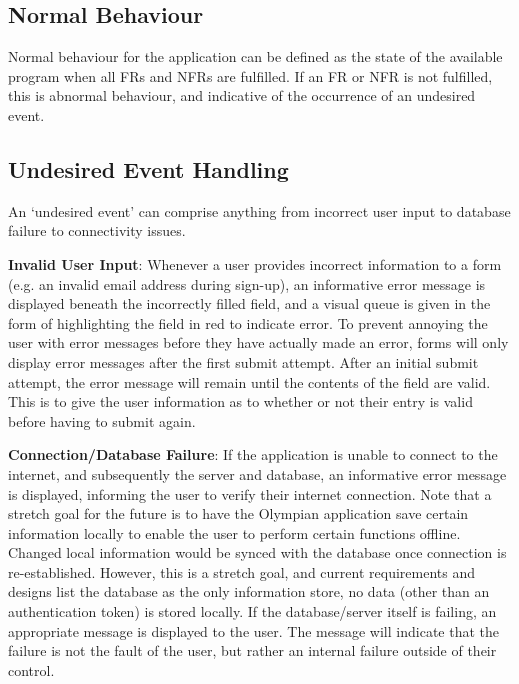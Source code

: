 \documentclass[12pt, titlepage]{article}
\begin{document}
	\subsection{Normal Behaviour}
	
	Normal behaviour for the application can be defined as the state of the available program when all FRs and NFRs are fulfilled. If an FR or NFR is not fulfilled, this is abnormal behaviour, and indicative of the occurrence of an undesired event.
	
	\subsection{Undesired Event Handling}
	
	
	An `undesired event' can comprise anything from incorrect user input to database failure to connectivity issues. 
	
	\textbf{Invalid User Input}: Whenever a user provides incorrect information to a form (e.g. an invalid email address during sign-up), an informative error message is displayed beneath the incorrectly filled field, and a visual queue is given in the form of highlighting the field in red to indicate error. To prevent annoying the user with error messages before they have actually made an error, forms will only display error messages after the first submit attempt. After an initial submit attempt, the error message will remain until the contents of the field are valid. This is to give the user information as to whether or not their entry is valid before having to submit again.
	
	\textbf{Connection/Database Failure}: If the application is unable to connect to the internet, and subsequently the server and database, an informative error message is displayed, informing the user to verify their internet connection. Note that a stretch goal for the future is to have the Olympian application save certain information locally to enable the user to perform certain functions offline. Changed local information would be synced with the database once connection is re-established. However, this is a stretch goal, and current requirements and designs list the database as the only information store, no data (other than an authentication token) is stored locally. If the database/server itself is failing, an appropriate message is displayed to the user. The message will indicate that the failure is not the fault of the user, but rather an internal failure outside of their control.
	\\
	
\end{document}
